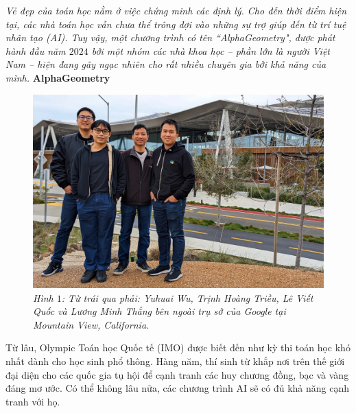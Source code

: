 \begin{multicols}{2}
	\textit{Vẻ đẹp của toán học nằm ở việc chứng minh các định lý. Cho đến thời điểm hiện tại, các nhà toán học vẫn chưa thể trông đợi vào những sự trợ giúp đến từ trí tuệ nhân tạo (AI). Tuy vậy, một chương trình có tên ``AlphaGeometry", được phát hành đầu năm $2024$ bởi một nhóm các nhà khoa học -- phần lớn là người Việt Nam -- hiện đang gây ngạc nhiên cho rất nhiều chuyên gia bởi khả năng của mình.}
	\vskip 0.1cm
	\textbf{\color{timhieukhoahoc}AlphaGeometry}
	\begin{figure}[H]
		\vspace*{-5pt}
		\centering
		\captionsetup{labelformat= empty, justification=centering}
		\includegraphics[width= 1\linewidth]{AlphaGeometry_team.jpg}
		\caption{\small\textit{\color{timhieukhoahoc}Hình $1$: Từ trái qua phải: Yuhuai Wu, Trịnh Hoàng Triều, Lê Viết Quốc và Lương Minh Thắng bên ngoài trụ sở của Google tại Mountain View, California.}}
		\vspace*{-10pt}
	\end{figure}
	Từ lâu, Olympic Toán học Quốc tế (IMO) được biết đến như kỳ thi toán học khó nhất dành cho học sinh phổ thông. Hàng năm, thí sinh từ khắp nơi trên thế giới đại diện cho các quốc gia tụ hội để cạnh tranh các huy chương đồng, bạc và vàng đáng mơ ước. Có thể không lâu nữa, các chương trình AI sẽ có đủ khả năng cạnh tranh với họ.
	\vskip 0.1cm

\end{multicols}
